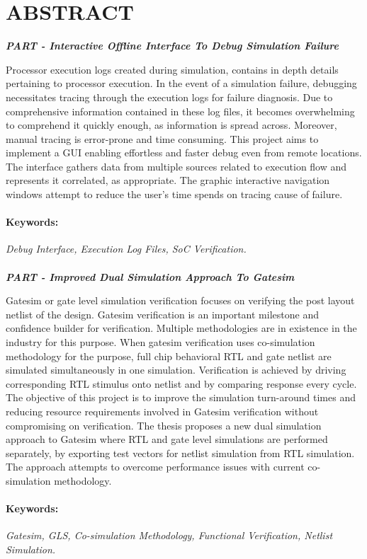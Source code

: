 \section*{\centering ABSTRACT}
\newcommand{\RNum}[1]{\uppercase\expandafter{\romannumeral #1\relax}}


\centerline{\emph{\bf PART \RNum{1}- Interactive Offline Interface To Debug Simulation Failure }}
\vspace{5pt}
Processor execution logs created during simulation, contains in depth details pertaining to processor execution.  In the event of a simulation failure, debugging necessitates tracing through the execution logs for failure diagnosis.  Due to comprehensive information contained in these log files, it becomes overwhelming to comprehend it quickly enough, as information is spread across. Moreover, manual tracing is error-prone and time consuming.
This project aims to implement a GUI  enabling effortless and faster debug even from remote locations. The interface gathers data from multiple sources related to execution flow and represents it correlated, as appropriate. The graphic interactive navigation windows attempt to reduce the user's time spends on tracing cause of failure.



\paragraph{Keywords:}
 \emph{Debug Interface, Execution Log Files, SoC  Verification.}


 \paragraph{}

\centerline{\emph{\bf PART \RNum{2}- Improved Dual Simulation Approach To Gatesim}}
\vspace{5pt}
Gatesim or gate level simulation verification focuses on verifying the post layout netlist of the design. Gatesim verification is an important milestone and confidence builder for verification. Multiple methodologies are in existence in the industry for this purpose. When gatesim verification uses co-simulation methodology for the purpose, full chip behavioral RTL  and gate netlist are simulated simultaneously in one simulation. Verification is achieved by driving corresponding RTL stimulus onto netlist and by comparing response every cycle.
The objective of this project is to improve the simulation turn-around times and reducing resource requirements involved in Gatesim verification without compromising on verification. The thesis proposes a new dual simulation approach to Gatesim where RTL and gate level simulations are performed separately, by exporting test vectors for netlist simulation from RTL simulation. The approach attempts to overcome performance issues with current co-simulation methodology.

\paragraph{Keywords:}
 \emph{Gatesim,  GLS,  Co-simulation Methodology,  Functional Verification, Netlist Simulation.}




